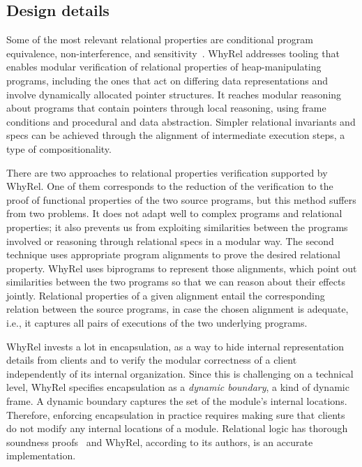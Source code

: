 \subsection{Design details}
\label{subsec:whyrel_deisgn}

Some of the most relevant relational properties are conditional program equivalence, non-interference, and sensitivity~\cite{barthe2019verifying}.
WhyRel addresses tooling that enables modular verification of relational properties of heap-manipulating programs, including the ones that act on differing data representations and involve dynamically allocated pointer structures.
It reaches modular reasoning about programs that contain pointers through local reasoning, using frame conditions and procedural and data abstraction.
Simpler relational invariants and specs can be achieved through the alignment of intermediate execution steps, a type of compositionality.

There are two approaches to relational properties verification supported by WhyRel.
One of them corresponds to the reduction of the verification to the proof of functional properties of the two source programs, but this method suffers from two problems.
It does not adapt well to complex programs and relational properties; it also prevents us from exploiting similarities between the programs involved or reasoning through relational specs in a modular way.
The second technique uses appropriate program alignments to prove the desired relational property.
WhyRel uses biprograms to represent those alignments, which point out similarities between the two programs so that we can reason about their effects jointly.
Relational properties of a given alignment entail the corresponding relation between the source programs, in case the chosen alignment is adequate, i.e., it captures all pairs of executions of the two underlying programs.

WhyRel invests a lot in encapsulation, as a way to hide internal representation details from clients and to verify the modular correctness of a client independently of its internal organization.
Since this is challenging on a technical level, WhyRel specifies encapsulation as a \emph{dynamic boundary}, a kind of dynamic frame.
A dynamic boundary captures the set of the module's internal locations.
Therefore, enforcing encapsulation in practice requires making sure that clients do not modify any internal locations of a module.
Relational logic has thorough soundness proofs~\cite{10.1145/3551497} and WhyRel, according to its authors, is an accurate implementation.

